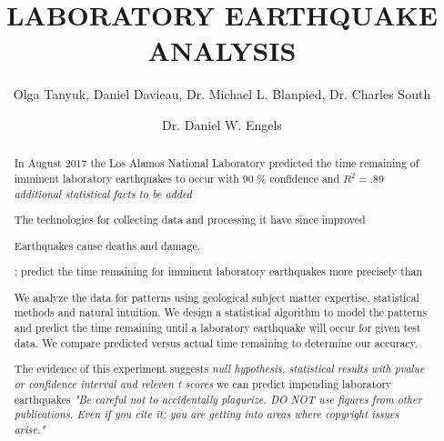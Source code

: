 \documentclass[]{llncs}
\begin{document}

\title{LABORATORY EARTHQUAKE ANALYSIS}

\author{Olga Tanyuk, Daniel Davieau, Dr. Michael L. Blanpied, Dr. Charles South \and Dr. Daniel W. Engels}



\maketitle

\begin{abstract}
In August 2017 the Los Alamos National Laboratory predicted\cite{Bertrand} the time remaining of imminent laboratory earthquakes to occur with 90 \% confidence and $ R^{2}=.89 $  {\em additional statistical facts to be added}\par

The technologies for collecting data and processing it have since improved

Earthquakes cause deaths and damage. \par
; predict the time remaining for imminent laboratory earthquakes more precisely than

We analyze the data for patterns using geological subject matter expertise, statistical methods and natural intuition. We design a statistical algorithm to model the patterns and predict the time remaining until a laboratory earthquake will occur for given test data. We compare predicted versus actual time remaining to determine our accuracy. \par
The evidence of this experiment suggests  {\em null hypothesis, statistical results with pvalue or confidence interval and releven t scores} we can predict impending laboratory earthquakes
{\em "Be careful not to accidentally plagurize. DO NOT use figures from other publications. Even if you cite it; you are getting into areas where copyright issues arise."}
\end{abstract}
\end{document}
